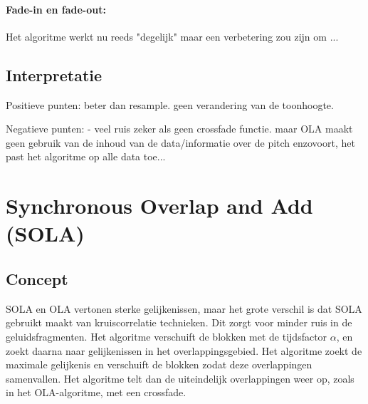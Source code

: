 \documentclass[12pt]{report}
\begin{document}
\paragraph{Fade-in en fade-out:} Het algoritme werkt nu reeds "degelijk" maar een verbetering zou zijn om ...
\subsection{Interpretatie}
Positieve punten:
beter dan resample.
geen verandering van de toonhoogte.

Negatieve punten:
- veel ruis zeker als geen crossfade functie.
maar OLA maakt geen gebruik van de inhoud van de data/informatie over de pitch enzovoort, het past het algoritme op alle data toe...

\section{Synchronous Overlap and Add (SOLA)}
\label{sec:SOLA}

\subsection{Concept}
SOLA en OLA vertonen sterke gelijkenissen, maar het grote verschil is dat SOLA gebruikt maakt van kruiscorrelatie technieken. Dit zorgt voor minder ruis in de geluidsfragmenten.
Het algoritme verschuift de blokken met de tijdsfactor $\alpha$, en zoekt daarna naar gelijkenissen in het overlappingsgebied. Het algoritme zoekt de maximale gelijkenis en verschuift de blokken zodat deze overlappingen samenvallen. Het algoritme telt dan de uiteindelijk overlappingen weer op, zoals in het OLA-algoritme, met een crossfade. 
\end{document}
